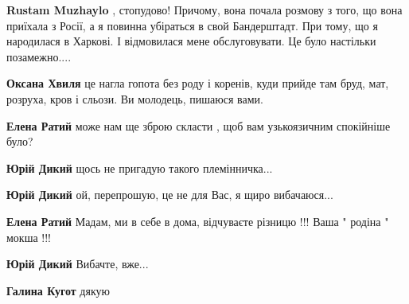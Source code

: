 \begin{itemize}
\begin{itemize}
\textbf{Rustam Muzhaylo} , стопудово! Причому, вона почала розмову з того, що вона приїхала з Росії, а я повинна убіраться в свой Бандерштадт. При тому, що я народилася в Харкові. І відмовилася мене обслуговувати. Це було настільки позамежно....

 
\textbf{Оксана Хвиля} це нагла гопота без роду і коренів, куди прийде там бруд, мат, розруха, кров і сльози. Ви молодець, пишаюся вами.

 
\textbf{Елена Ратий} може нам ще зброю скласти , щоб вам узькоязичним спокійніше було?

 
\textbf{Юрій Дикий} щось не пригадую такого племінничка...

 
\textbf{Юрій Дикий} ой, перепрошую, це не для Вас, я щиро вибачаюся...

 
\textbf{Елена Ратий} Мадам, ми в себе в дома, відчуваєте різницю !!! Ваша " родіна " мокша !!!

 
\textbf{Юрій Дикий} Вибачте, вже...

 
\textbf{Галина Кугот} дякую

\end{itemize}
\end{itemize}

